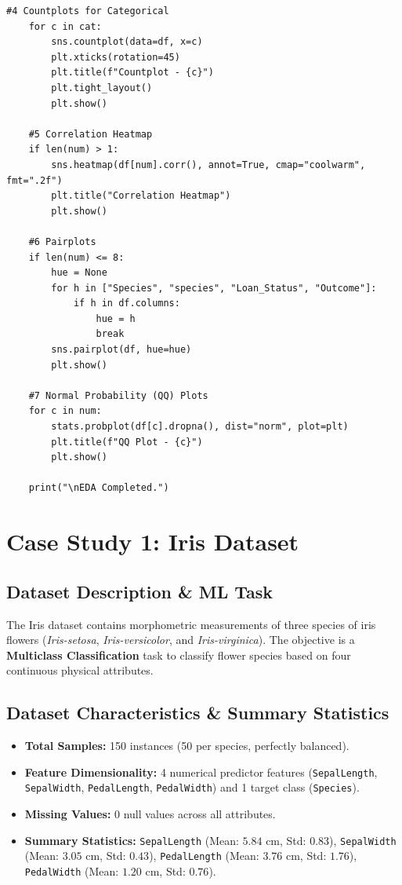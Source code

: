 \documentclass[12pt,a4paper]{article}
\begin{document}
\begin{lstlisting}[caption={Complete Universal EDA Implementation Code (perform\_EDA)}]
    #4 Countplots for Categorical
    for c in cat:
        sns.countplot(data=df, x=c)
        plt.xticks(rotation=45)
        plt.title(f"Countplot - {c}")
        plt.tight_layout()
        plt.show()

    #5 Correlation Heatmap
    if len(num) > 1:
        sns.heatmap(df[num].corr(), annot=True, cmap="coolwarm", fmt=".2f")
        plt.title("Correlation Heatmap")
        plt.show()

    #6 Pairplots
    if len(num) <= 8:
        hue = None
        for h in ["Species", "species", "Loan_Status", "Outcome"]:
            if h in df.columns:
                hue = h
                break
        sns.pairplot(df, hue=hue)
        plt.show()

    #7 Normal Probability (QQ) Plots
    for c in num:
        stats.probplot(df[c].dropna(), dist="norm", plot=plt)
        plt.title(f"QQ Plot - {c}")
        plt.show()

    print("\nEDA Completed.")
\end{lstlisting}

\section{Case Study 1: Iris Dataset}

\subsection{Dataset Description \& ML Task}
The Iris dataset contains morphometric measurements of three species of iris flowers (\textit{Iris-setosa}, \textit{Iris-versicolor}, and \textit{Iris-virginica}). The objective is a \textbf{Multiclass Classification} task to classify flower species based on four continuous physical attributes.

\subsection{Dataset Characteristics \& Summary Statistics}
\begin{itemize}
    \item \textbf{Total Samples:} 150 instances (50 per species, perfectly balanced).
    \item \textbf{Feature Dimensionality:} 4 numerical predictor features (\texttt{SepalLength}, \texttt{SepalWidth}, \texttt{PedalLength}, \texttt{PedalWidth}) and 1 target class (\texttt{Species}).
    \item \textbf{Missing Values:} 0 null values across all attributes.
    \item \textbf{Summary Statistics:} \texttt{SepalLength} (Mean: $5.84$ cm, Std: $0.83$), \texttt{SepalWidth} (Mean: $3.05$ cm, Std: $0.43$), \texttt{PedalLength} (Mean: $3.76$ cm, Std: $1.76$), \texttt{PedalWidth} (Mean: $1.20$ cm, Std: $0.76$).
\end{itemize}
\end{document}
